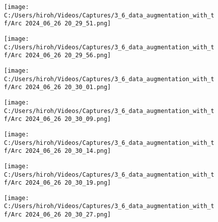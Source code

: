 \documentclass{ltjsarticle}
\begin{document}
\begin{figure}[htbp]
  \centering
  \texttt{[image: C:/Users/hiroh/Videos/Captures/3\_6\_data\_augmentation\_with\_tf/Arc 2024\_06\_26 20\_29\_51.png]}
\end{figure}
\begin{figure}[htbp]
  \centering
  \texttt{[image: C:/Users/hiroh/Videos/Captures/3\_6\_data\_augmentation\_with\_tf/Arc 2024\_06\_26 20\_29\_56.png]}
\end{figure}
\begin{figure}[htbp]
  \centering
  \texttt{[image: C:/Users/hiroh/Videos/Captures/3\_6\_data\_augmentation\_with\_tf/Arc 2024\_06\_26 20\_30\_01.png]}
\end{figure}
\begin{figure}[htbp]
  \centering
  \texttt{[image: C:/Users/hiroh/Videos/Captures/3\_6\_data\_augmentation\_with\_tf/Arc 2024\_06\_26 20\_30\_09.png]}
\end{figure}
\begin{figure}[htbp]
  \centering
  \texttt{[image: C:/Users/hiroh/Videos/Captures/3\_6\_data\_augmentation\_with\_tf/Arc 2024\_06\_26 20\_30\_14.png]}
\end{figure}
\begin{figure}[htbp]
  \centering
  \texttt{[image: C:/Users/hiroh/Videos/Captures/3\_6\_data\_augmentation\_with\_tf/Arc 2024\_06\_26 20\_30\_19.png]}
\end{figure}
\begin{figure}[htbp]
  \centering
  \texttt{[image: C:/Users/hiroh/Videos/Captures/3\_6\_data\_augmentation\_with\_tf/Arc 2024\_06\_26 20\_30\_27.png]}
\end{figure}
\end{document}
